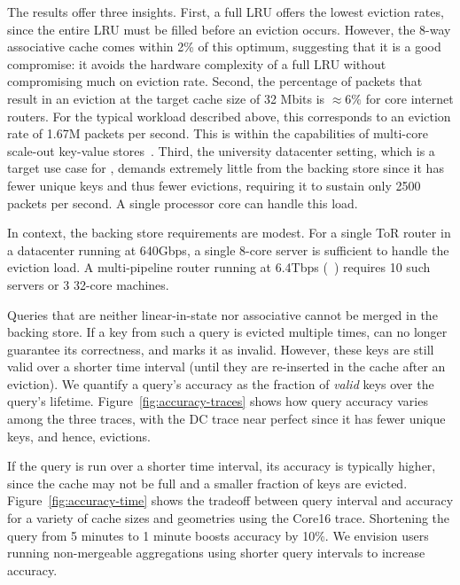The results offer three insights. First, a full LRU offers the lowest eviction
rates, since the entire LRU must be filled before an eviction occurs. However,
the 8-way associative cache comes within 2\% of this optimum, suggesting that it
is a good compromise: it avoids the hardware complexity of a full LRU without
compromising much on eviction rate. 
Second, the percentage of packets that result in an eviction at the target cache size of 32 Mbits is $\approx6\%$ for core internet routers. For the typical workload described above, this corresponds to an eviction rate of 1.67M packets per second. This is within the capabilities of multi-core scale-out key-value stores~\cite{redis_benchmark, memcached_benchmark, redis_vs_memcached, redis_vs_memcached_update}.
Third, the university datacenter setting, which is a target use case for \TheSystem,
demands extremely little from the backing store since it has fewer unique keys
and thus fewer evictions, requiring it to sustain only 2500 packets per
second. A single processor core can handle this load.

In context, the backing store requirements are modest. For a single ToR router in a datacenter running at 640Gbps, a single 8-core server is sufficient to handle the eviction load. A multi-pipeline router running at 6.4Tbps (\eg~\cite{tofino}) requires 10 such servers or 3 32-core machines.

Queries that are neither linear-in-state nor associative cannot be merged in the
backing store. If a key from such a query is evicted multiple times, \TheSystem
can no longer guarantee its correctness, and marks it as invalid. However, these
keys are still valid over a shorter time interval (until they are re-inserted in the
cache after an eviction). We quantify a query's accuracy as the fraction
of \emph{valid} keys over the query's lifetime. Figure~\ref{fig:accuracy-traces}
shows how query accuracy varies among the three traces, with the DC trace
near perfect since it has fewer unique keys, and hence, evictions.

If the query is run over a shorter time interval, its accuracy is typically higher, since the cache may not be full and a smaller fraction of keys are evicted. 
Figure~\ref{fig:accuracy-time} shows the tradeoff between query interval and accuracy for a variety of cache sizes and geometries using the Core16 trace.
Shortening the query from 5 minutes to 1 minute boosts accuracy by 10\%. We envision users
running non-mergeable aggregations using shorter query intervals to increase accuracy.

